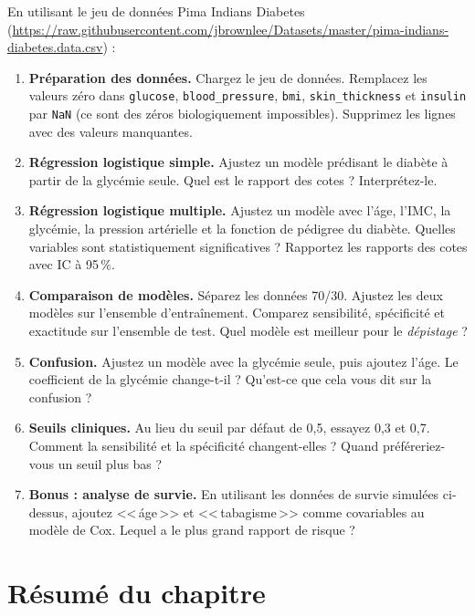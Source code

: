 \begin{exercise}
En utilisant le jeu de donn\'ees Pima Indians Diabetes (\url{https://raw.githubusercontent.com/jbrownlee/Datasets/master/pima-indians-diabetes.data.csv}) :
\begin{enumerate}
  \item \textbf{Pr\'eparation des donn\'ees.} Chargez le jeu de donn\'ees. Remplacez les valeurs z\'ero dans \texttt{glucose}, \texttt{blood\_pressure}, \texttt{bmi}, \texttt{skin\_thickness} et \texttt{insulin} par \texttt{NaN} (ce sont des z\'eros biologiquement impossibles). Supprimez les lignes avec des valeurs manquantes.
  \item \textbf{R\'egression logistique simple.} Ajustez un mod\`ele pr\'edisant le diab\`ete \`a partir de la glyc\'emie seule. Quel est le rapport des cotes ? Interpr\'etez-le.
  \item \textbf{R\'egression logistique multiple.} Ajustez un mod\`ele avec l'\'age, l'IMC, la glyc\'emie, la pression art\'erielle et la fonction de p\'edigree du diab\`ete. Quelles variables sont statistiquement significatives ? Rapportez les rapports des cotes avec IC \`a 95\,\%.
  \item \textbf{Comparaison de mod\`eles.} S\'eparez les donn\'ees 70/30. Ajustez les deux mod\`eles sur l'ensemble d'entra\^inement. Comparez sensibilit\'e, sp\'ecificit\'e et exactitude sur l'ensemble de test. Quel mod\`ele est meilleur pour le \emph{d\'epistage} ?
  \item \textbf{Confusion.} Ajustez un mod\`ele avec la glyc\'emie seule, puis ajoutez l'\'age. Le coefficient de la glyc\'emie change-t-il ? Qu'est-ce que cela vous dit sur la confusion ?
  \item \textbf{Seuils cliniques.} Au lieu du seuil par d\'efaut de 0,5, essayez 0,3 et 0,7. Comment la sensibilit\'e et la sp\'ecificit\'e changent-elles ? Quand pr\'ef\'ereriez-vous un seuil plus bas ?
  \item \textbf{Bonus : analyse de survie.} En utilisant les donn\'ees de survie simul\'ees ci-dessus, ajoutez <<\,\'age\,>> et <<\,tabagisme\,>> comme covariables au mod\`ele de Cox. Lequel a le plus grand rapport de risque ?
\end{enumerate}
\end{exercise}

\section{R\'esum\'e du chapitre}

